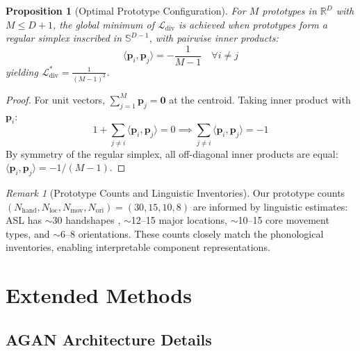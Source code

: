 \documentclass{article}
\newtheorem{proposition}[theorem]{Proposition}
\theoremstyle{definition}
\theoremstyle{remark}
\newtheorem{remark}[theorem]{Remark}
\begin{document}
\begin{proposition}[Optimal Prototype Configuration]
\label{prop:optimal_config}
For $M$ prototypes in $\mathbb{R}^D$ with $M \leq D+1$, the global minimum of $\mathcal{L}_{\text{div}}$ is achieved when prototypes form a regular simplex inscribed in $\mathbb{S}^{D-1}$, with pairwise inner products:
\begin{equation}
\langle \mathbf{p}_i, \mathbf{p}_j \rangle = -\frac{1}{M-1} \quad \forall i \neq j
\end{equation}
yielding $\mathcal{L}_{\text{div}}^* = \frac{1}{(M-1)^2}$.
\end{proposition}

\begin{proof}
For unit vectors, $\sum_{j=1}^M \mathbf{p}_j = \mathbf{0}$ at the centroid. Taking inner product with $\mathbf{p}_i$:
\begin{equation}
1 + \sum_{j \neq i} \langle \mathbf{p}_i, \mathbf{p}_j \rangle = 0 \implies \sum_{j \neq i} \langle \mathbf{p}_i, \mathbf{p}_j \rangle = -1
\end{equation}
By symmetry of the regular simplex, all off-diagonal inner products are equal: $\langle \mathbf{p}_i, \mathbf{p}_j \rangle = -1/(M-1)$.
\end{proof}

\begin{remark}[Prototype Counts and Linguistic Inventories]
Our prototype counts $(N_{\text{hand}}, N_{\text{loc}}, N_{\text{mov}}, N_{\text{ori}}) = (30, 15, 10, 8)$ are informed by linguistic estimates: ASL has $\sim$30 handshapes \citep{battison1978lexical}, $\sim$12--15 major locations, $\sim$10--15 core movement types, and $\sim$6--8 orientations. These counts closely match the phonological inventories, enabling interpretable component representations.
\end{remark}

\section{Extended Methods}

\subsection{AGAN Architecture Details}
\end{document}
